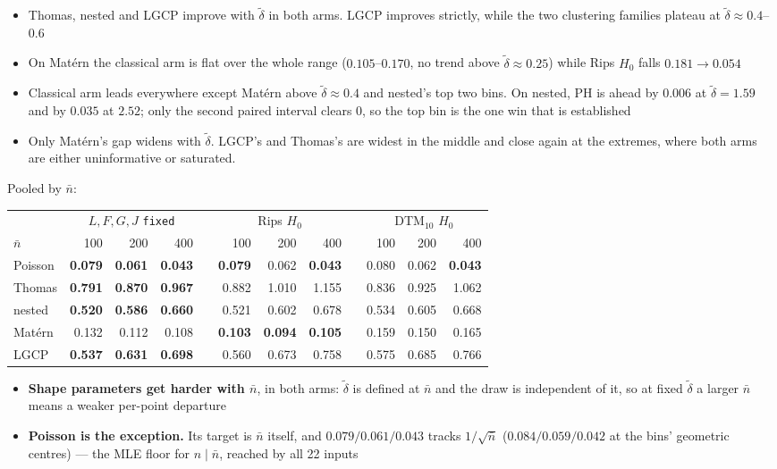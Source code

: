 \documentclass[11pt]{article}
\newcommand{\dt}{\tilde\delta}
\newcommand{\nb}{\bar n}
\begin{document}
\smallskip
\begin{itemize}
  \item Thomas, nested and LGCP improve with $\dt$ in both arms. LGCP improves strictly, while the two clustering families plateau at $\dt\approx0.4$--$0.6$
  \item On Mat\'ern the classical arm is flat over the whole range ($0.105$--$0.170$, no trend above $\dt\approx0.25$) while Rips $H_0$ falls $0.181\to0.054$
  \item Classical arm leads everywhere except Mat\'ern above $\dt\approx0.4$ and nested's top two bins. On nested, PH is ahead by $0.006$ at $\dt=1.59$ and by $0.035$ at $2.52$; only the second paired interval clears $0$, so the top bin is the one win that is established
  \item Only Mat\'ern's gap widens with $\dt$. LGCP's and Thomas's are widest in the middle and close again at the extremes, where both arms are either uninformative or saturated.
\end{itemize}

\newpage
Pooled by $\nb$:

\smallskip
\begin{tabular}{@{}lrrrcrrrcrrr@{}}
\toprule
 & \multicolumn{3}{c}{$L,F,G,J$ \texttt{fixed}} & & \multicolumn{3}{c}{Rips $H_0$} & & \multicolumn{3}{c}{DTM$_{10}$ $H_0$} \\
\cmidrule(r){2-4}\cmidrule(lr){6-8}\cmidrule(l){10-12}
$\nb$    & 100 & 200 & 400 & & 100 & 200 & 400 & & 100 & 200 & 400 \\
\midrule
Poisson  & \textbf{0.079} & \textbf{0.061} & \textbf{0.043} & & \textbf{0.079} & 0.062 & \textbf{0.043} & & 0.080 & 0.062 & \textbf{0.043} \\
Thomas   & \textbf{0.791} & \textbf{0.870} & \textbf{0.967} & & 0.882 & 1.010 & 1.155 & & 0.836 & 0.925 & 1.062 \\
nested   & \textbf{0.520} & \textbf{0.586} & \textbf{0.660} & & 0.521 & 0.602 & 0.678 & & 0.534 & 0.605 & 0.668 \\
Mat\'ern & 0.132 & 0.112 & 0.108 & & \textbf{0.103} & \textbf{0.094} & \textbf{0.105} & & 0.159 & 0.150 & 0.165 \\
LGCP     & \textbf{0.537} & \textbf{0.631} & \textbf{0.698} & & 0.560 & 0.673 & 0.758 & & 0.575 & 0.685 & 0.766 \\
\bottomrule
\end{tabular}

\smallskip
\begin{itemize}
  \item \textbf{Shape parameters get harder with $\nb$}, in both arms: $\dt$ is defined at $\nb$ and the draw is independent of it, so at fixed $\dt$ a larger $\nb$ means a weaker per-point departure
  \item \textbf{Poisson is the exception.} Its target is $\nb$ itself, and $0.079/0.061/0.043$ tracks $1/\sqrt{\nb}$ ($0.084/0.059/0.042$ at the bins' geometric centres) --- the MLE floor for $n\mid\nb$, reached by all 22 inputs
\end{itemize}
\end{document}
